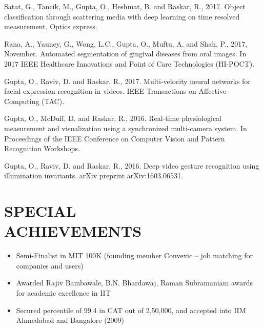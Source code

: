 \documentclass[margin, 10pt]{res} %
\begin{document}
\begin{resume}
\begin{etaremune}
\item Satat, G., Tancik, M., Gupta, O., Heshmat, B. and Raskar, R., 2017. Object classification through scattering media with deep learning on time resolved measurement. Optics express.
\item Rana, A., Yauney, G., Wong, L.C., Gupta, O., Muftu, A. and Shah, P., 2017, November. Automated segmentation of gingival diseases from oral images. In 2017 IEEE Healthcare Innovations and Point of Care Technologies (HI-POCT).
\item Gupta, O., Raviv, D. and Raskar, R., 2017. Multi-velocity neural networks for facial expression recognition in videos. IEEE Transactions on Affective Computing (TAC).
\item Gupta, O., McDuff, D. and Raskar, R., 2016. Real-time physiological measurement and visualization using a synchronized multi-camera system. In Proceedings of the IEEE Conference on Computer Vision and Pattern Recognition Workshops.
\item Gupta, O., Raviv, D. and Raskar, R., 2016. Deep video gesture recognition using illumination invariants. arXiv preprint arXiv:1603.06531.



\end{etaremune}


\section{SPECIAL \\ACHIEVEMENTS}


\begin{itemize}
\item Semi-Finalist in MIT 100K (founding member Convexic – job matching for companies and users)
\item Awarded Rajiv Bambawale, B.N. Bhardawaj, Raman Subramaniam awards for academic excellence in IIT
\item Secured percentile of 99.4 in CAT out of 2,50,000, and accepted into IIM Ahmedabad and Bangalore (2009)
\end{itemize} 



\end{resume}
\end{document}
